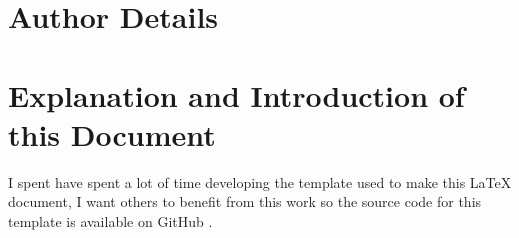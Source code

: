 \documentclass[colorlinks,11pt,a4paper,normalphoto,withhyper,ragged2e]{altareport}
\begin{document}
	
	\MakeReportTitlePage
	
	
	\setcounter{page}{1}
	
	
	
	
	\section*{Author Details}
	
		\makeauthordetails
		
		
		
		\setcounter{tocdepth}{2} 
		\tableofcontents %
	
	
	
	
	\fontsize{11pt}{12pt}\selectfont %
	
	\abovedisplayskip=0pt
	\abovedisplayshortskip=2pt
	\belowdisplayskip=12pt
	\belowdisplayshortskip=12pt
	
	
	
	
	
	\section*{Explanation and Introduction of this Document}
		I spent have spent a lot of time developing the template used to make this {\LaTeX} document, I want others to benefit from this work so the source code for this template is available on GitHub \cite{latex_template_github}.
		
		
	\newpage
	
	
	
		
	
	
	
	
	
	
	
	\newpage
%	
	
\end{document}
